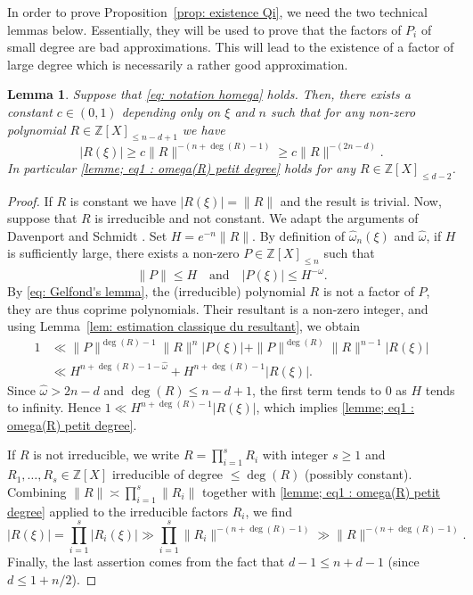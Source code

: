 \documentclass[JEP,XML,SOM,Unicode,NoFloatCountersInSection,published]{cedram}
\newcommand\bZ{\mathbb{Z}}
\newcommand\homega{\widehat{\omega}}\newcommand\HH{\mathcal{H}}
\newcommand{\normH}[1]{\|#1\|}
\newcommand\AND{\quad\text{and}\quad}
\theoremstyle{definition}
\theoremstyle{plain}
\newtheorem{Lem}[Def]{Lemma}
\begin{document}
In order to prove Proposition~\ref{prop: existence Qi}, we need the two technical lemmas below. Essentially, they will be used to prove that the factors of $P_i$ of small degree are bad approximations. This will lead to the existence of a factor of large degree which is necessarily a rather good approximation.

\begin{Lem}
\label{lemme: omega(R) petit degre}
Suppose that \eqref{eq: notation homega} holds. Then, there exists a constant $c\in(0,1)$ depending only on $\xi$ and $n$ such that for any non-zero polynomial $R\in \bZ[X]_{\leq n-d+1}$ we have
\begin{equation}
\label{lemme; eq1 : omega(R) petit degree}
|R(\xi)| \geq c\normH{R}^{-(n + \deg(R) - 1)} \geq c\normH{R}^{-(2n-d)}.
\end{equation}
In particular \eqref{lemme; eq1 : omega(R) petit degree} holds for any $R\in\bZ[X]_{\leq d-2}$.
\end{Lem}

\begin{proof}
If $R$ is constant we have $|R(\xi)| = \normH{R}$ and the result is trivial. Now, suppose that $R$ is irreducible and not constant. We adapt the arguments of Davenport and Schmidt \cite[\S 5--6]{davenport1969approximation}. Set $H = e^{-n}\normH{R}$. By definition of $\homega_n(\xi)$ and $\homega$, if $H$ is sufficiently large, there exists a non-zero $P\in\bZ[X]_{\leq n}$ such that
\[
\normH{P} \leq H \AND |P(\xi)| \leq H^{-\homega}.
\]
By \eqref{eq: Gelfond's lemma}, the (irreducible) polynomial $R$ is not a factor of $P$, they are thus coprime polynomials. Their resultant is a non-zero integer, and using Lemma~\ref{lem: estimation classique du resultant}, we obtain
\begin{align*}
1 & \ll \normH{P}^{\deg(R)-1}\normH{R}^{n}|P(\xi)| + \normH{P}^{\deg(R)}\normH{R}^{n-1}|R(\xi)| \\
& \ll H^{n+\deg(R)-1-\homega} + H^{n+\deg(R)-1}|R(\xi)|.
\end{align*}
Since $\homega > 2n-d$ and $\deg(R) \leq n-d+1$, the first term tends to $0$ as $H$ tends to infinity. Hence $ 1 \ll H^{n+\deg(R)-1}|R(\xi)|$, which implies \eqref{lemme; eq1 : omega(R) petit degree}.

If $R$ is not irreducible, we write $R = \prod_{i=1}^{s}R_i$ with integer $s\geq 1$ and $R_1,\dots,R_s\in\bZ[X]$ irreducible of degree $\leq \deg(R)$ (possibly constant). Combining $\normH{R} \asymp \prod_{i=1}^{s}\normH{R_i}$ together with \eqref{lemme; eq1 : omega(R) petit degree} applied to the irreducible factors $R_i$, we find
\begin{equation*}
|R(\xi)| = \prod_{i=1}^{s}|R_i(\xi)| \gg \prod_{i=1}^{s}\normH{R_i}^{-(n + \deg(R) - 1)} \gg \normH{R}^{-(n + \deg(R) - 1)}.
\end{equation*}
Finally, the last assertion comes from the fact that $d-1\leq n+d-1$ (since $d\leq 1+n/2$).
\end{proof}
\end{document}

